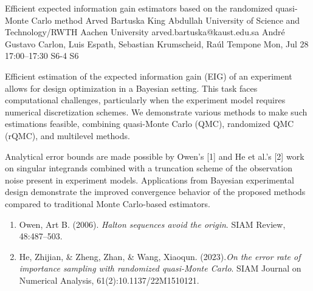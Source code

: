 \documentclass[12pt,lettersize,oneside]{book} %
\begin{document}
\begin{talk}
  {Efficient expected information gain estimators based on the randomized quasi-Monte Carlo method}%
  {Arved Bartuska}%
  {King Abdullah University of Science and Technology/RWTH Aachen University}%
  {arved.bartuska@kaust.edu.sa}%
  {Andr\'{e} Gustavo Carlon, Luis Espath, Sebastian Krumscheid, Ra\'{u}l Tempone}%
  {}%
  {Mon, Jul 28 17:00--17:30}%
  {S6-4}%
  {S6}%
  
    
   
Efficient estimation of the expected information gain (EIG) of an experiment allows for design optimization in a Bayesian setting. This task faces computational challenges, particularly when the experiment model requires numerical discretization schemes. We demonstrate various methods to make such estimations feasible, combining quasi-Monte Carlo (QMC), randomized QMC (rQMC), and multilevel methods.

Analytical error bounds are made possible by Owen's [1] and He et al.'s [2] work on singular integrands combined with a truncation scheme of the observation noise present in experiment models. Applications from Bayesian experimental design demonstrate the improved convergence behavior of the proposed methods compared to traditional Monte Carlo-based estimators.

\medskip

\begin{enumerate}
 \item[{[1]}] Owen, Art B. (2006). {\it Halton sequences avoid the origin}. SIAM Review, 48:487--503.
 \item[{[2]}] He, Zhijian, \& Zheng, Zhan, \& Wang, Xiaoqun. (2023).{\it On the error rate of importance sampling with randomized quasi-Monte Carlo}. SIAM Journal
on Numerical Analysis,  61(2):10.1137/22M1510121.
\end{enumerate}

\end{talk}
\end{document}
